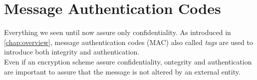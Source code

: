 \section{Message Authentication Codes}
Everything we seen until now assure only confidentiality. As introduced in \autoref{chap:overview}, message authentication codes (MAC) also called \emph{tags} are used to introduce both integrity and authentication.\\
Even if an encryption scheme assure confidentiality, ontegrity and authentication are important to assure that the message is not altered by an external entity.

